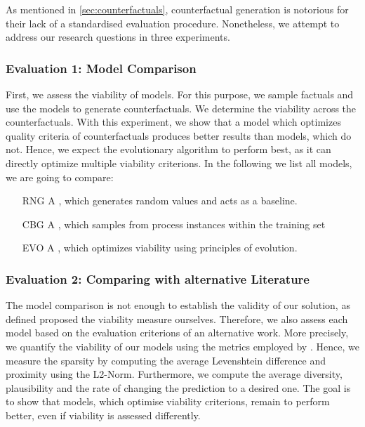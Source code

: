 \documentclass[./../../paper.tex]{subfiles}
\begin{document}
As mentioned in \autoref{sec:counterfactuals}, counterfactual generation is notorious for their lack of a standardised evaluation procedure. Nonetheless, we attempt to address our research questions in three experiments.

\subsubsection{Evaluation 1: Model Comparison}
First, we assess the viability of  models. For this purpose, we sample  factuals and use the models to generate  counterfactuals. We determine the  viability across the counterfactuals. With this experiment, we show that a model which optimizes quality criteria of counterfactuals produces better results than models, which do not. Hence, we expect the evolutionary algorithm to perform best, as it can directly optimize multiple viability criterions. In the following we list all models, we are going to compare:

\begin{enumerate}
    \item[RNG] A \ModelRNG, which generates random values and acts as a baseline. 
    \item[CBG] A \ModelCBG, which samples from process instances within the training set
    \item[EVO] A \ModelEVO, which optimizes viability using principles of evolution.
\end{enumerate}

\subsubsection{Evaluation 2: Comparing with alternative Literature}
The model comparison is not enough to establish the validity of our solution, as defined proposed the viability measure ourselves. Therefore, we also assess each model based on the evaluation criterions of an alternative work. More precisely, we quantify the viability of our models using the metrics employed by \citeauthor{hsieh_DiCE4ELInterpretingProcess_2021}. Hence, we measure the sparsity by computing the average Levenshtein difference and proximity using the L2-Norm. Furthermore, we compute the average diversity, plausibility and the rate of changing the prediction to a desired one. The goal is to show that models, which optimise viability criterions, remain to perform better, even if viability is assessed differently. 
\end{document}
